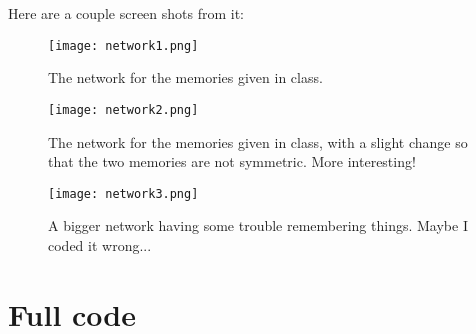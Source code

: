 \documentclass{article}
\begin{document}
Here are a couple screen shots from it:

\begin{figure}[h!]
 \centering
  \texttt{[image: network1.png]}
  \label{fig:1}
  \caption{The network for the memories given in class.}
\end{figure}

\begin{figure}[h!]
 \centering
  \texttt{[image: network2.png]}
  \label{fig:2}
  \caption{The network for the memories given in class, with a slight change so that the two memories are not symmetric. More interesting!}
\end{figure}

\begin{figure}[h!]
 \centering
  \texttt{[image: network3.png]}
  \label{fig:2}
  \caption{A bigger network having some trouble remembering things. Maybe I coded it wrong...}
\end{figure}

\clearpage
\pagebreak

\section*{Full code}



\clearpage
\pagebreak


\end{document}
